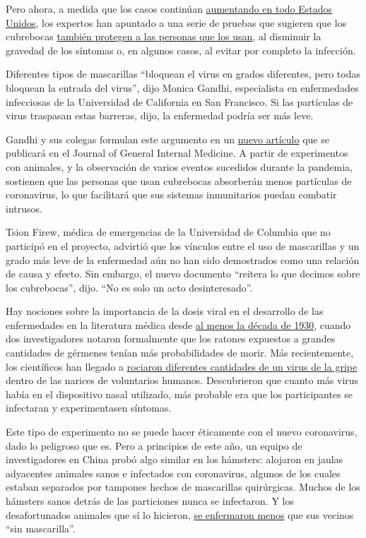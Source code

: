 Pero ahora, a medida que los casos continúan
\href{https://www.nytimes.com/es/interactive/2020/espanol/mundo/coronavirus-en-estados-unidos.html}{aumentando
en todo Estados Unidos}, los expertos han apuntado a una serie de
pruebas que sugieren que los cubrebocas
\href{https://pubmed.ncbi.nlm.nih.gov/23498357/}{también protegen a las
personas que los usan}, al disminuir la gravedad de los síntomas o, en
algunos casos, al evitar por completo la infección.

Diferentes tipos de mascarillas ``bloquean el virus en grados
diferentes, pero todas bloquean la entrada del virus'', dijo Monica
Gandhi, especialista en enfermedades infecciosas de la Universidad de
California en San Francisco. Si las partículas de virus traspasan estas
barreras, dijo, la enfermedad podría ser más leve.

Gandhi y sus colegas formulan este argumento en un
\href{https://ucsf.app.box.com/s/blvolkp5z0mydzd82rjks4wyleagt036}{nuevo
artículo} que se publicará en el Journal of General Internal Medicine. A
partir de experimentos con animales, y la observación de varios eventos
sucedidos durante la pandemia, sostienen que las personas que usan
cubrebocas absorberán menos partículas de coronavirus, lo que facilitará
que sus sistemas inmunitarios puedan combatir intrusos.

Tsion Firew, médica de emergencias de la Universidad de Columbia que no
participó en el proyecto, advirtió que los vínculos entre el uso de
mascarillas y un grado más leve de la enfermedad aún no han sido
demostrados como una relación de causa y efecto. Sin embargo, el nuevo
documento ``reitera lo que decimos sobre los cubrebocas'', dijo. ``No es
solo un acto desinteresado''.

Hay nociones sobre la importancia de la dosis viral en el desarrollo de
las enfermedades en la literatura médica desde
\href{https://academic.oup.com/aje/article-abstract/27/3/493/99616}{al
menos la década de 1930}, cuando dos investigadores notaron formalmente
que los ratones expuestos a grandes cantidades de gérmenes tenían más
probabilidades de morir. Más recientemente, los científicos han llegado
a \href{https://pubmed.ncbi.nlm.nih.gov/25416753/}{rociaron diferentes
cantidades de un virus de la gripe} dentro de las narices de voluntarios
humanos. Descubrieron que cuanto más virus había en el dispositivo nasal
utilizado, más probable era que los participantes se infectaran y
experimentasen síntomas.

Este tipo de experimento no se puede hacer éticamente con el nuevo
coronavirus, dado lo peligroso que es. Pero a principios de este año, un
equipo de investigadores en China probó algo similar en los hámsters:
alojaron en jaulas adyacentes animales sanos e infectados con
coronavirus, algunos de los cuales estaban separados por tampones hechos
de mascarillas quirúrgicas. Muchos de los hámsters sanos detrás de las
particiones nunca se infectaron. Y los desafortunados animales que sí lo
hicieron,
\href{https://academic.oup.com/cid/article/doi/10.1093/cid/ciaa644/5848814}{se
enfermaron menos} que sus vecinos ``sin mascarilla''.

